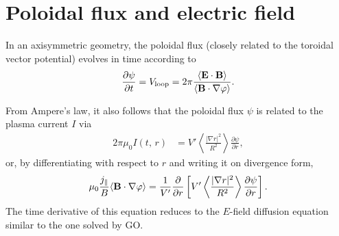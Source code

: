 \documentclass[11pt,a4paper]{article}
\newcommand{\sub}[1]{\ensuremath{_{\text{#1}}}}
\renewcommand{\b}[1]{\ensuremath{ {\bf #1 } }}
\begin{document}



\section{Poloidal flux and electric field}
In an axisymmetric geometry, the poloidal flux (closely related to the toroidal vector potential) evolves in time according to
\begin{align}
\frac{\partial \psi}{\partial t} = V\sub{loop} = 2\pi \frac{\langle \b{E}\cdot\b{B} \rangle }{\left\langle \b{B}\cdot\nabla \varphi \right\rangle } .
\label{eq:poloidal flux evolution}
\end{align}

From Ampere's law, it also follows that the poloidal flux $\psi$ is related to the plasma current $I$ via
\begin{align}
2\pi \mu_0 I(t,\,r) &= V'\left\langle \frac{|\nabla r|^2}{R^2}\right\rangle \frac{\partial \psi}{\partial r},
\end{align}
or, by differentiating with respect to $r$ and writing it on divergence form,
\begin{align}
\mu_0 \frac{j_\parallel}{B} \langle \b{B}\cdot\nabla\varphi\rangle = \frac{1}{V'}\frac{\partial }{\partial r}\left[V'\left\langle \frac{|\nabla r|^2}{R^2}\right\rangle \frac{\partial \psi}{\partial r}\right].
\end{align}
The time derivative of this equation reduces to the $E$-field diffusion equation similar to the one solved by GO.
\end{document}
